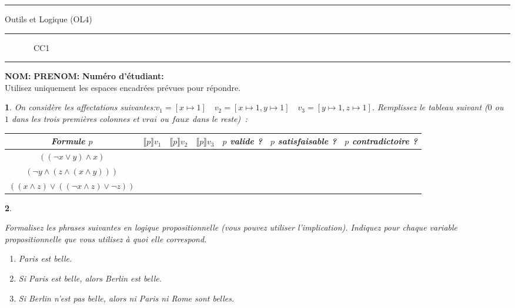 \documentclass[a4paper,10pt,french]{article}
\newtheorem{exi}{}
\newenvironment{exo}{\begin{exi}\em}{\end{exi}}
\newcommand{\rsem}{\rrbracket}
\newcommand{\inte}[2]{\llbracket #1 \rsem {#2}}
\begin{document}
\vspace*{-1cm}
\hrule
\medbreak
\centerline{\textsf{O{\small utils} et L{\small ogique} (OL4)}}
\medbreak
\hrule
\medbreak
\centerline{\textsf{\phantom{(} ~~~~~~~CC1~~~~~~~\phantom{)}}}
\medbreak
\hrule

\bigskip
\bigskip

{\bf NOM:} \hspace*{4cm} {\bf PRENOM:} \hspace*{3cm} {\bf Numéro
  d'étudiant:}\\

Utilisez uniquement les espaces encadrées prévues pour répondre.

\begin{exo}
  On considère les affectations suivantes:$
v_1 = [ x\mapsto 1] \quad
v_2= [ x\mapsto 1, y\mapsto 1 ]  \quad
v_3= [ y\mapsto 1, z\mapsto 1 ]$.
Remplissez le tableau suivant ($0$ ou $1$ dans les trois premières colonnes et $vrai$ ou $\mathit{faux}$ dans le reste)~:
\begin{tabular}{|c|c|c|c|c|c|c|}
  \hline
    Formule $p$ &$\inte{p}{v_1}$&$\inte{p}{v_2}$&$\inte{p}{v_3}$&$p$ valide ?&$p$ satisfaisable ?&$p$ contradictoire ?\\[0.5ex]
    \hline
    $((\neg x \vee y) \land x)$&&&&&&\\[0.5ex]
    \hline
    $(\neg y \land (z \land (x \land y)))$&&&&&&\\[0.5ex]
    \hline
    $((x \land z) \vee ((\neg x \land z) \vee \neg z))$&&&&&&\\[0.5ex]
    \hline
  \end{tabular}
\end{exo}

\begin{exo}%

  Formalisez les phrases suivantes en logique propositionnelle
  (vous pouvez utiliser l'implication).
  Indiquez pour chaque variable propositionnelle que vous utilisez
  à quoi elle correspond.

  \begin{enumerate}
  \item Paris est belle.%
  \item Si Paris est belle, alors Berlin est belle.
  \item Si Berlin n'est pas belle, alors ni Paris ni Rome sont belles.
  \end{enumerate}

  \framebox[\textwidth]{
      \rule[-0.4cm]{0mm}{4cm}
  }

\end{exo}
\end{document}
